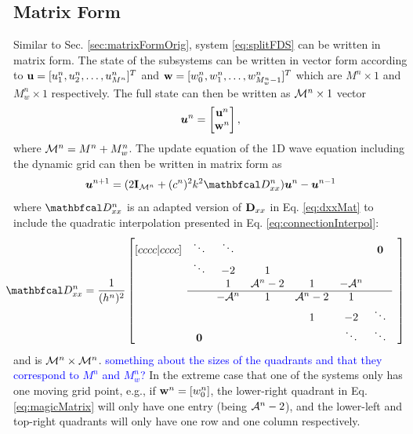 \documentclass[fleqn]{jaes}
\def\SWcomment[#1]{\textcolor{blue}{#1}}
\begin{document}
\subsection{Matrix Form}\label{sec:matrixForm}
Similar to Sec. \ref{sec:matrixFormOrig}, system \eqref{eq:splitFDS} can be written in matrix form. The state of the subsystems can be written in vector form according to $\mathbf{u} = [u_1^n, u_2^n, \hdots, u_{M^n}^n]^T$ and $\mathbf{w} = [w_0^n, w_1^n, \hdots, w_{M_w^n-1}^n]^T$ which are $M^n \times 1$ and $M_w^n \times 1$ respectively. The full state can then be written as ${\mathcal{M}^n} \times 1$ vector
\begin{equation}\label{eq:uStack}
    \uStack^n = \begin{bmatrix}
    \u^n\\
    \w^n
    \end{bmatrix},
\end{equation}
where ${\mathcal{M}^n} = M^n + M_w^n$.
The update equation of the 1D wave equation including the dynamic grid can then be written in matrix form as
\begin{equation}
    \uStack^{n+1} = (2\I_\MoneD + (c^n)^2k^2\DDxx)\uStack^n - \uStack^{n-1} 
\end{equation}
where $\DDxx$ is an adapted version of $\mathbf{D}_{xx}$ in Eq. \eqref{eq:dxxMat} to include the quadratic interpolation presented in Eq. \eqref{eq:connectionInterpol}:
\begin{equation}\label{eq:magicMatrix}
    \!\!\!\!\!\!\DDxx = \frac{1}{(h^n)^2}\begin{bmatrix}[cccc|cccc]
     & \ddots  &\ddots & & & & \boldsymbol{0} & \\
       & \ddots & -2 & 1 & & & & \\
      & & 1 & \Aterm -2 & 1 & -\Aterm & \\ \cline{2-7}
      & & -\Aterm & 1 & \Aterm -2 & 1 & & \\
         & & & &1 & -2 & \ddots  \\
         & \boldsymbol{0} & &  &  &\ddots & \ddots &
    \end{bmatrix}
\end{equation}
and is ${\mathcal{M}^n} \times {\mathcal{M}^n}$. \SWcomment[something about the sizes of the quadrants and that they correspond to $M^n$ and $M_w^n$?] In the extreme case that one of the systems only has one moving grid point, e.g., if $\mathbf{w}^n =[w_0^n]$, the lower-right quadrant in Eq. \eqref{eq:magicMatrix} will only have one entry (being $\mathcal{A}^n-2$), and the lower-left and top-right quadrants will only have one row and one column respectively. 
\end{document}
